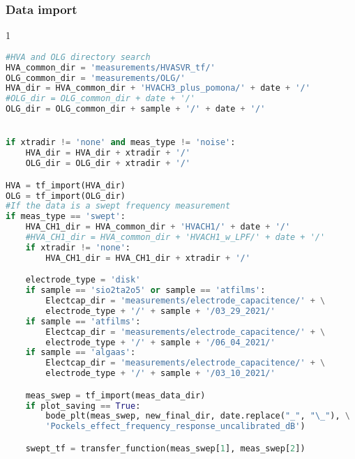 \subsubsection{Data import}\label{data-import}

\begin{spacing}{1} \begin{lstlisting}[frame=single, language=Python]
#HVA and OLG directory search
HVA_common_dir = 'measurements/HVASVR_tf/'                             # HVA and OLG directories
OLG_common_dir = 'measurements/OLG/'
HVA_dir = HVA_common_dir + 'HVACH3_plus_pomona/' + date + '/'
#OLG_dir = OLG_common_dir + date + '/'
OLG_dir = OLG_common_dir + sample + '/' + date + '/'


if xtradir != 'none' and meas_type != 'noise':
    HVA_dir = HVA_dir + xtradir + '/'
    OLG_dir = OLG_dir + xtradir + '/'

HVA = tf_import(HVA_dir)                                                     # import the HVA and OLG data
OLG = tf_import(OLG_dir)
#If the data is a swept frequency measurement
if meas_type == 'swept':                                                     # import HVA CH1 transfer function data for transfer function measurement
    HVA_CH1_dir = HVA_common_dir + 'HVACH1/' + date + '/'
    #HVA_CH1_dir = HVA_common_dir + 'HVACH1_w_LPF/' + date + '/'
    if xtradir != 'none':
        HVA_CH1_dir = HVA_CH1_dir + xtradir + '/'

    electrode_type = 'disk'                                                  # import low pass measurement from resistor / electrode capacitence
    if sample == 'sio2ta2o5' or sample == 'atfilms':
        Electcap_dir = 'measurements/electrode_capacitence/' + \
        electrode_type + '/' + sample + '/03_29_2021/'
    if sample == 'atfilms':
        Electcap_dir = 'measurements/electrode_capacitence/' + \
        electrode_type + '/' + sample + '/06_04_2021/'
    if sample == 'algaas':
        Electcap_dir = 'measurements/electrode_capacitence/' + \
        electrode_type + '/' + sample + '/03_10_2021/'

    meas_swep = tf_import(meas_data_dir)                                     # import transfer function measurement
    if plot_saving == True:                                                  # plot uncalibrated transfer function measurement if requested
        bode_plt(meas_swep, new_final_dir, date.replace("_", "\_"), \
        'Pockels_effect_frequency_response_uncalibrated_dB')

    swept_tf = transfer_function(meas_swep[1], meas_swep[2])                 # combine amplitude and phase


\end{lstlisting}
\end{spacing}
